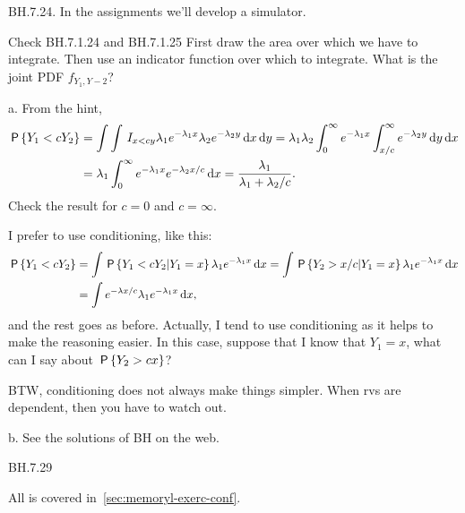 \setcounter{theorem}{23}
\begin{exercise}
BH.7.24.
In the assignments we'll develop a simulator.

\begin{hint}
Check BH.7.1.24 and BH.7.1.25
First draw the area over which we have to integrate. Then use an indicator function over which to integrate. What is the joint PDF  $f_{Y_1, Y-2}$?
\end{hint}
\begin{solution}
a. From the hint,
\begin{align*}
\P{Y_1<c Y_2}
  &= \int \int \1{x<c y}\lambda_1 e^{-\lambda_1 x} \lambda_2e^{-\lambda_2 y}\d x \d y
  = \lambda_1\lambda_2\int_0^{\infty} e^{-\lambda_{1}x}\int_{x/c}^{\infty} e^{-\lambda_{2} y}\d y \d x\\
  & = \lambda_1\int_0^{\infty} e^{-\lambda_{1}x} e^{-\lambda_{2} x/c} \d x
  = \frac{\lambda_1}{\lambda_1+\lambda_2/c}.
\end{align*}
Check the result for $c=0$ and $c=\infty$.

I prefer to use conditioning, like this:
\begin{align*}
\P{Y_1<c Y_2}
  &= \int \P{Y_1<cY_2| Y_1=x}\lambda_1 e^{-\lambda_1 x} \d x
  = \int \P{Y_2>x/c| Y_1=x}\lambda_1 e^{-\lambda_1 x} \d x\\
&= \int e^{-\lambda x/c} \lambda_1 e^{-\lambda_1 x} \d x,
\end{align*}
and the rest goes as before. Actually, I tend to use conditioning as it helps to make the reasoning easier. In this case, suppose that I know that $Y_1=x$, what can I say about $\P{Y_2 > c x}$?

BTW, conditioning does not always make things simpler. When rvs are dependent, then you have to watch out.

b. See the solutions of BH on the web.
\end{solution}
\end{exercise}


\setcounter{theorem}{28}
\begin{exercise}
BH.7.29
\begin{solution}
All is covered in~\cref{sec:memoryl-exerc-conf}.
\end{solution}
\end{exercise}

